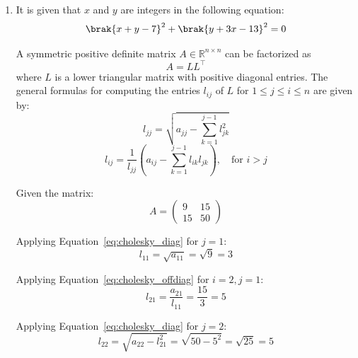\begin{enumerate}[label=\thesubsection.\arabic*, ref=\thesubsection.\theenumi, itemsep=0pt, leftmargin=*]
\item It is given that $x$ and $y$ are integers in the following equation:
\begin{align}
\brak{x + y - 7}^2 + \brak{y + 3x - 13}^2 = 0
\end{align}


A symmetric positive definite matrix $A \in \mathbb{R}^{n \times n}$ can be factorized as
\begin{equation}
    A = LL^{\top} \label{eq:1.1.5.1}
\end{equation}
where $L$ is a lower triangular matrix with positive diagonal entries. The general formulas for computing the entries $l_{ij}$ of $L$ for $1 \le j \le i \le n$ are given by:
\begin{equation}
    l_{jj} = \sqrt{a_{jj} - \sum_{k=1}^{j-1} l_{jk}^2} \label{eq:cholesky_diag}
\end{equation}
\begin{equation}
    l_{ij} = \frac{1}{l_{jj}} \left( a_{ij} - \sum_{k=1}^{j-1} l_{ik} l_{jk} \right), \quad \text{for } i > j \label{eq:cholesky_offdiag}
\end{equation}

Given the matrix:
\[
    A = \begin{pmatrix} 9 & 15 \\ 15 & 50 \end{pmatrix}
\]

Applying Equation~\eqref{eq:cholesky_diag} for $j = 1$:
\begin{equation}
    l_{11} = \sqrt{a_{11}} = \sqrt{9} = 3 \label{eq:1.2.8.2}
\end{equation}

Applying Equation~\eqref{eq:cholesky_offdiag} for $i = 2, j = 1$:
\begin{equation}
    l_{21} = \frac{a_{21}}{l_{11}} = \frac{15}{3} = 5 \label{eq:1.2.8.3}
\end{equation}

Applying Equation~\eqref{eq:cholesky_diag} for $j = 2$:
\begin{equation}
    l_{22} = \sqrt{a_{22} - l_{21}^2} = \sqrt{50 - 5^2} = \sqrt{25} = 5 \label{eq:1.2.8.4}
\end{equation}


\end{enumerate}
